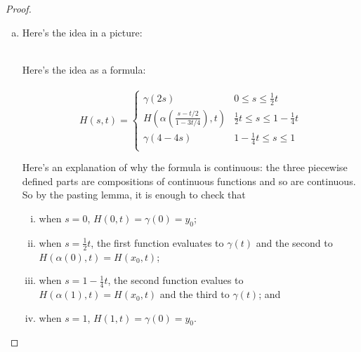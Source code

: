 \documentclass{article}
\begin{document}
\begin{proof} \text{} \\
  \begin{enumerate}[(a)]
    \item
    \begin{multicols}{2}
      Here's the idea in a picture:\\
      \\
      Here's the idea as a formula:
      \\\vspace{0.7cm}\\
      \[
        H(s, t) = \begin{cases}
          \gamma(2s) & 0 \leq s \leq \frac{1}{2}t \\
          \displaystyle H\left(\alpha\left(\frac{s - t/2}{1 - 3t/4}\right), t\right) & \frac{1}{2}t \leq s \leq 1 - \frac{1}{4}t \\
          \gamma(4-4s) & 1 - \frac{1}{4}t \leq s \leq 1 \\
        \end{cases}
      \]
    \end{multicols}
    Here's an explanation of why the formula is continuous: the three piecewise
    defined parts are compositions of continuous functions and so are continuous.
    So by the pasting lemma, it is enough to check that \begin{enumerate}[(i)]
      \item when $s=0$, $H(0, t) = \gamma(0) = y_0$;
      \item when $s = \frac{1}{2}t$, the first function evaluates to $\gamma(t)$ and the second to $H(\alpha(0),t) = H(x_0,t)$;
      \item when $s = 1 - \frac{1}{4}t$, the second function evalues to $H(\alpha(1),t) = H(x_0,t)$ and the third to $\gamma(t)$; and
      \item when $s=1$, $H(1, t) = \gamma(0) = y_0$.

\end{enumerate}
\end{enumerate}
\end{proof}
\end{document}
